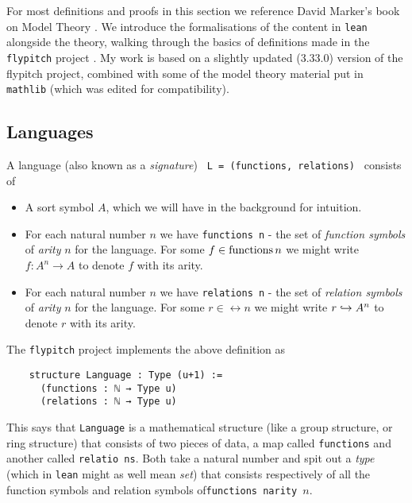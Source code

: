 For most definitions and proofs in this section we reference
David Marker's book on Model Theory \cite{marker}.
We introduce the formalisations of the content in \texttt{lean} alongside the theory,
walking through the basics of definitions made in the \texttt{flypitch} project \cite{flypitch}.
My work is based on a slightly updated (3.33.0) version of the flypitch project,
combined with some of the model theory material put in \texttt{mathlib} (which was edited for compatibility).

\subsection{Languages}
\begin{dfn}[Language]
  A language (also known as a \textit{signature}) \texttt{ L = (functions, relations) } consists of

  \begin{itemize}
    \item A sort symbol $A$, which we will have in the background for intuition.
    \item For each natural number $n$ we have \texttt{functions n} -
          the set of \textit{function symbols} of \textit{arity} $n$ for the language.
          For some $f \in \operatorname{functions} n$ we might write
          $f : A^{n} \to A$ to denote $f$ with its arity.
    \item For each natural number $n$ we have \texttt{relations n} -
          the set of \textit{relation symbols} of \textit{arity} $n$ for the language.
          For some $r \in \rel n$ we might write
          $r \hookrightarrow A^{n}$ to denote $r$ with its arity.
  \end{itemize}

  The \texttt{flypitch} project implements the above definition as

  \begin{lstlisting}
    structure Language : Type (u+1) :=
      (functions : ℕ → Type u)
      (relations : ℕ → Type u)\end{lstlisting}

  This says that \texttt{Language} is a mathematical structure
  (like a group structure, or ring structure)
  that consists of two pieces of data,
  a map called \texttt{functions} and another called \texttt{relatio ns}.
  Both take a natural number and spit out a \textit{type}
  (which in \texttt{lean} might as well mean \textit{set})
  that consists respectively of all the function symbols and relation symbols of\texttt{functions narity $n$}.


\end{dfn}

